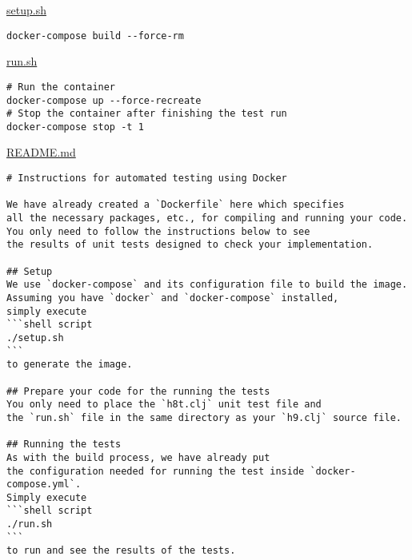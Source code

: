 \documentclass[11pt]{article}
\begin{document}
\href{./testing/h10/setup.sh}{setup.sh}
\begin{verbatim}
docker-compose build --force-rm
\end{verbatim}

\href{./testing/h10/run.sh}{run.sh}
\begin{verbatim}
# Run the container
docker-compose up --force-recreate
# Stop the container after finishing the test run
docker-compose stop -t 1
\end{verbatim}

\href{./testing/h10/README.md}{README.md}
\begin{verbatim}
# Instructions for automated testing using Docker

We have already created a `Dockerfile` here which specifies
all the necessary packages, etc., for compiling and running your code.
You only need to follow the instructions below to see 
the results of unit tests designed to check your implementation.

## Setup
We use `docker-compose` and its configuration file to build the image.
Assuming you have `docker` and `docker-compose` installed,
simply execute
```shell script
./setup.sh
```
to generate the image.

## Prepare your code for the running the tests
You only need to place the `h8t.clj` unit test file and
the `run.sh` file in the same directory as your `h9.clj` source file.

## Running the tests
As with the build process, we have already put
the configuration needed for running the test inside `docker-compose.yml`.
Simply execute
```shell script
./run.sh
```
to run and see the results of the tests.
\end{verbatim}
\end{document}
